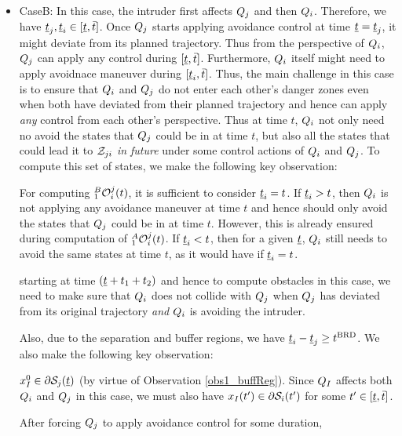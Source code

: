 \begin{itemize}[leftmargin=*]
\item \label{sec:intruderObs_case1_caseB} CaseB: In this case, the intruder first affects $Q_j$ and then $Q_i$. Therefore, we have $\underline{t}_j, \underline{t}_i \in [\underline{t}, \bar{t}]$. Once $Q_j$ starts applying avoidance control at time $\underline{t} = \underline{t}_j$, it might deviate from its planned trajectory. Thus from the perspective of $Q_i$, $Q_j$ can apply any control during $[\underline{t}, \bar{t}]$. Furthermore, $Q_i$ itself might need to apply avoidnace maneuver during $[\underline{t}_i, \bar{t}]$. Thus, the main challenge in this case is to ensure that $Q_i$ and $Q_j$ do not enter each other's danger zones even when both have deviated from their planned trajectory and hence can apply \textit{any} control from each other's perspective. Thus at time $t$, $Q_i$ not only need no avoid the states that $Q_j$ could be in at time $t$, but also all the states that could lead it to $\mathcal{Z}_{ji}$ \textit{in future} under some control actions of $Q_i$ and $Q_j$. To compute this set of states, we make the following key observation:
\begin{observation} \label{obs1_case1_caseB}
For computing $_1^B\mathcal{O}_i^j(t)$, it is sufficient to consider $\underline{t}_i = t$. If $\underline{t}_i > t$, then $Q_i$ is not applying any avoidance maneuver at time $t$ and hence should only avoid the states that $Q_j$ could be in at time $t$. However, this is already ensured during computation of $_1^A\mathcal{O}_i^j(t)$. If $\underline{t}_i < t$, then for a given $\underline{t}$, $Q_i$ still needs to avoid the same states at time $t$, as it would have if $\underline{t}_i = t$.  
\end{observation}


starting at time $(\underline{t} + t_1 + t_2)$ and hence to compute obstacles in this case, we need to make sure that $Q_i$ does not collide with $Q_j$ when $Q_j$ has deviated from its original trajectory \textit{and} $Q_i$ is avoiding the intruder.

Also, due to the separation and buffer regions, we have $\underline{t}_i - \underline{t}_j \geq t^\text{BRD}$. We also make the following key observation:

$x_{I}^0 \in \partial\mathcal{S}_j(\underline{t})$ (by virtue of Observation \ref{obs1_buffReg}). Since $Q_{I}$ affects both $Q_i$ and $Q_j$ in this case, we must also have $x_{I}(t') \in \partial\mathcal{S}_i(t')$ for some $t' \in [\underline{t}, \bar{t}]$.

After forcing $Q_j$ to apply avoidance control for some duration, 


\end{itemize}
